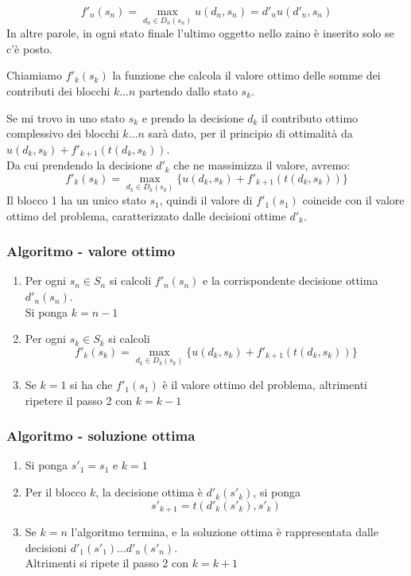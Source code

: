 \documentclass[../template]{subfiles}
\begin{document}
\[
    f'_n(s_n) = \max_{d_n \in D_n(s_n)} u(d_n, s_n) = d'_n u(d'_n, s_n)
\]
In altre parole, in ogni stato finale l'ultimo oggetto nello zaino è inserito solo se c'è posto.

Chiamiamo $f'_k(s_k)$ la funzione che calcola il valore ottimo delle somme dei contributi dei blocchi $k \dots n$ partendo dallo stato $s_k$.

Se mi trovo in uno stato $s_k$ e prendo la decisione $d_k$ il contributo ottimo complessivo dei blocchi $k \dots n$ sarà dato, per il principio di ottimalità da $u(d_k, s_k) + f'_{k+1} (t(d_k, s_k))$.
\\
Da cui prendendo la decisione $d'_k$ che ne massimizza il valore, avremo:
\[
    f'_k(s_k) = \max_{d_k \in D_k(s_k)} \big\{u(d_k, s_k) + f'_{k+1}(t(d_k, s_k))\big\}
\]
Il blocco 1 ha un unico stato $s_1$, quindi il valore di $f'_1(s_1)$ coincide con il valore ottimo del problema, caratterizzato dalle decisioni ottime $d'_k$.
\subsubsection{Algoritmo - valore ottimo}
\begin{enumerate}
    \item
        Per ogni $s_n \in S_n$ si calcoli $f'_n(s_n)$ e la corrispondente decisione ottima $d'_n(s_n)$.
        \\
        Si ponga $k = n-1$
    \item
        Per ogni $s_k \in S_k$ si calcoli
        \[
            f'_k(s_k) = \max_{d_k \in D_k(s_k)} \big\{ u(d_k, s_k) + f'_{k+1}(t(d_k, s_k))\big\}
        \]

    \item
        Se $k=1$ si ha che $f'_1(s_1)$ è il valore ottimo del problema, altrimenti ripetere il passo 2 con $k=k-1$
\end{enumerate}
\subsubsection{Algoritmo - soluzione ottima}
\begin{enumerate}
    \item Si ponga $s'_1 = s_1$ e $k=1$
    \item Per il blocco $k$, la decisione ottima è $d'_k(s'_k)$, si ponga
        \[
            s'_{k+1} = t(d'_k(s'_k), s'_k)
        \]
    \item Se $k=n$ l'algoritmo termina, e la soluzione ottima è rappresentata dalle decisioni
        $d'_1(s'_1) \dots d'_n(s'_n)$.
        \\
        Altrimenti  si ripete il passo 2 con $k = k +1$
\end{enumerate}
\end{document}
